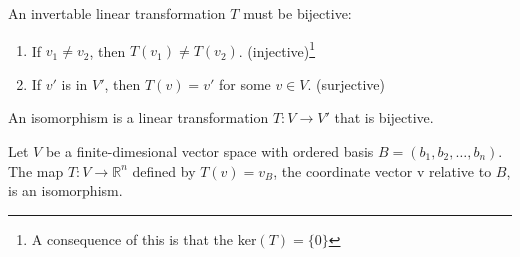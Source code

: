 \documentclass[nobib,notoc]{tufte-handout}
\begin{document}
\begin{cor}
	An invertable linear transformation \(T\) must be bijective:
	\begin{enumerate}
		\item If \(v_1\neq v_2\), then \(T(v_1)\neq T(v_2)\). (injective)\footnote{A consequence of this is that the ker\((T)=\{0\}\)}
		\item If \(v'\) is in \(V'\), then \(T(v)=v'\) for some \(v\in V\). (surjective)
	\end{enumerate}
\end{cor}
\begin{defi}[Isomorphism]
	An isomorphism is a linear transformation \(T:V\rightarrow V'\) that is bijective.
\end{defi}
\begin{thm}
	Let \(V\) be a finite-dimesional vector space with ordered basis \(B=(b_1,b_2,\ldots,b_n)\). The map \(T:V\rightarrow\mathbb{R}^n\) defined by \(T(v)=v_B\), the coordinate vector v relative to \(B\), is an isomorphism.
\end{thm}
\end{document}
